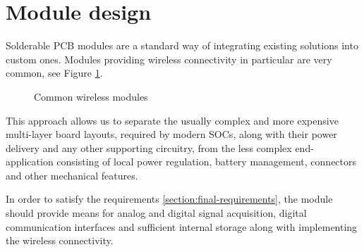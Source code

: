 \section{Module design}

Solderable PCB modules are a standard way of integrating existing solutions into custom ones. Modules providing wireless connectivity in particular are very common, see Figure \ref{fig:wireless-modules}.

\begin{figure}
    \centering
    \caption{\label{fig:wireless-modules} Common wireless modules}
\end{figure}

This approach allows us to separate the usually complex and more expensive multi-layer board layouts, required by modern SOCs, along with their power delivery and any other supporting circuitry, from the less complex end-application consisting of local power regulation, battery management, connectors and other mechanical features.

In order to satisfy the requirements \ref{section:final-requirements}, the module should provide means for analog and digital signal acquisition, digital communication interfaces and sufficient internal storage along with implementing the wireless connectivity.

